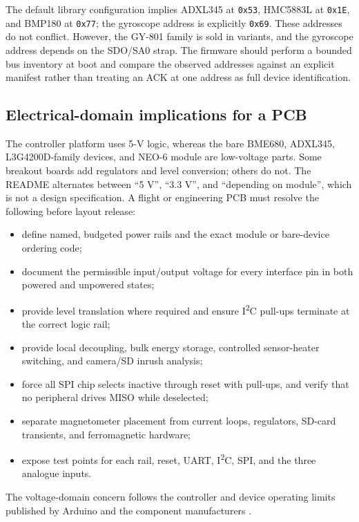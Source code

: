 \documentclass[11pt,a4paper]{article}
\newcommand{\code}[1]{\texttt{#1}}
\begin{document}
The default library configuration implies ADXL345 at \code{0x53}, HMC5883L at \code{0x1E}, and BMP180 at \code{0x77}; the gyroscope address is explicitly \code{0x69}. These addresses do not conflict. However, the GY-801 family is sold in variants, and the gyroscope address depends on the SDO/SA0 strap. The firmware should perform a bounded bus inventory at boot and compare the observed addresses against an explicit manifest rather than treating an ACK at one address as full device identification.

\subsection{Electrical-domain implications for a PCB}

The controller platform uses 5-V logic, whereas the bare BME680, ADXL345, L3G4200D-family devices, and NEO-6 module are low-voltage parts. Some breakout boards add regulators and level conversion; others do not. The README alternates between ``5 V'', ``3.3 V'', and ``depending on module'', which is not a design specification. A flight or engineering PCB must resolve the following before layout release:

\begin{itemize}
  \item define named, budgeted power rails and the exact module or bare-device ordering code;
  \item document the permissible input/output voltage for every interface pin in both powered and unpowered states;
  \item provide level translation where required and ensure I\textsuperscript{2}C pull-ups terminate at the correct logic rail;
  \item provide local decoupling, bulk energy storage, controlled sensor-heater switching, and camera/SD inrush analysis;
  \item force all SPI chip selects inactive through reset with pull-ups, and verify that no peripheral drives MISO while deselected;
  \item separate magnetometer placement from current loops, regulators, SD-card transients, and ferromagnetic hardware;
  \item expose test points for each rail, reset, UART, I\textsuperscript{2}C, SPI, and the three analogue inputs.
\end{itemize}

The voltage-domain concern follows the controller and device operating limits published by Arduino and the component manufacturers \cite{mega,bme680,adxl,l3g,neo6}.
\end{document}
